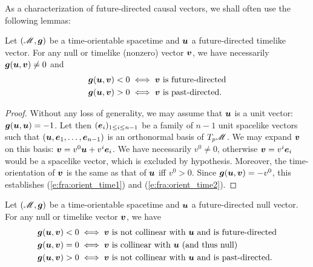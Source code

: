 As a characterization of future-directed causal vectors,
we shall often use the following lemmas:

\begin{lemma}
\label{p:fra:lem1}
Let $(\mathscr{M},\bm{g})$ be a time-orientable spacetime and $\bm{u}$ a future-directed
timelike vector. For any null or timelike (nonzero) vector $\bm{v}$, we have necessarily
$\bm{g}(\bm{u},\bm{v}) \neq 0$ and
\begin{subequations}
\begin{align}
& \bm{g}(\bm{u},\bm{v}) < 0 \iff \bm{v} \ \mbox{is future-directed} \label{e:fra:orient_time1} \\
& \bm{g}(\bm{u},\bm{v}) > 0 \iff \bm{v} \ \mbox{is past-directed} . \label{e:fra:orient_time2}
\end{align}
\end{subequations}
\end{lemma}
\begin{proof}
Without any loss of generality, we may assume that $\bm{u}$ is a unit vector: $\bm{g}(\bm{u},\bm{u}) = -1$.
Let then $(\bm{e}_i)_{1\leq i \leq n-1}$ be a family of $n-1$ unit spacelike vectors such
that $(\bm{u},\bm{e}_1,\ldots,\bm{e}_{n-1})$ is an orthonormal basis of $T_p\mathscr{M}$.
We may expand $\bm{v}$ on this basis: $\bm{v} = v^0 \bm{u} + v^i \bm{e}_i$.
We have
necessarily $v^0 \not = 0$, otherwise $\bm{v} = v^i \bm{e}_i$ would be a spacelike
vector, which is excluded by hypothesis.
Moreover, the time-orientation of $\bm{v}$ is the same as that of $\bm{u}$
iff $v^0>0$. Since $\bm{g}(\bm{u},\bm{v}) = - v^0$, this
establishes (\ref{e:fra:orient_time1}) and (\ref{e:fra:orient_time2}).
\end{proof}

\begin{lemma}
\label{p:fra:lem2}
Let $(\mathscr{M},\bm{g})$ be a time-orientable spacetime and $\bm{u}$ a future-directed
null vector. For any null or timelike vector $\bm{v}$, we have
\begin{subequations}
\begin{align}
& \bm{g}(\bm{u},\bm{v}) < 0 \iff \bm{v} \ \mbox{is not collinear with $\bm{u}$ and is future-directed} \label{e:fra:orient_null1} \\
& \bm{g}(\bm{u},\bm{v}) = 0 \iff \mbox{$\bm{v}$ is collinear with $\bm{u}$ (and thus null)} \label{e:fra:orient_null2} \\
& \bm{g}(\bm{u},\bm{v}) > 0 \iff \bm{v} \ \mbox{is not collinear with $\bm{u}$ and is past-directed} . \label{e:fra:orient_null3}
\end{align}
\end{subequations}
\end{lemma}

